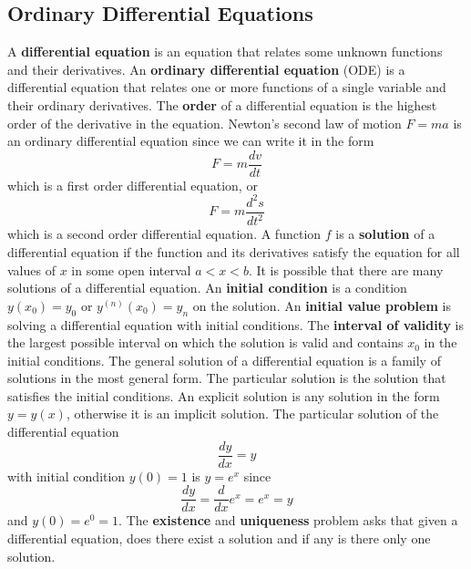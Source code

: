 \subsection{Ordinary Differential Equations}
A \textbf{differential equation} is an equation that relates some unknown
functions and their derivatives.
An \textbf{ordinary differential equation} (ODE) is a differential equation
that relates one or more functions of a single variable and their ordinary
derivatives.
The \textbf{order} of a differential equation is the highest order of the
derivative in the equation.
Newton's second law of motion \(F=ma\) is an ordinary differential
equation since we can write it in the form
\[F=m\frac{dv}{dt}\]
which is a first order differential equation, or
\[F=m\frac{d^2s}{dt^2}\]
 which is a second order differential equation.
A function \(f\) is a \textbf{solution} of a differential equation if the
function and its derivatives satisfy the equation for all values of \(x\) in
some open interval \(a<x<b\).
It is possible that there are many solutions of a differential equation.
An \textbf{initial condition} is a condition \(y(x_0)=y_0\) or
\(y^{(n)}(x_0)=y_n\) on the solution.
An \textbf{initial value problem} is solving a differential equation with initial conditions.
The \textbf{interval of validity} is the largest possible interval on which
the solution is valid and contains \(x_0\) in the initial conditions.
The general solution of a differential equation is a family of solutions in
the most general form.
The particular solution is the solution that satisfies the initial conditions.
An explicit solution is any solution in the form \(y=y(x)\), otherwise it is
an implicit solution.
The particular solution of the differential equation
\[\frac{dy}{dx}=y\]
with initial
condition \(y(0)=1\) is \(y=e^x\) since
\[\frac{dy}{dx}=\frac{d}{dx}e^x=e^x=y\]
and \(y(0)=e^0=1\).
The \textbf{existence} and \textbf{uniqueness} problem asks that given a
differential equation, does there exist a solution and if any is there only
one solution.